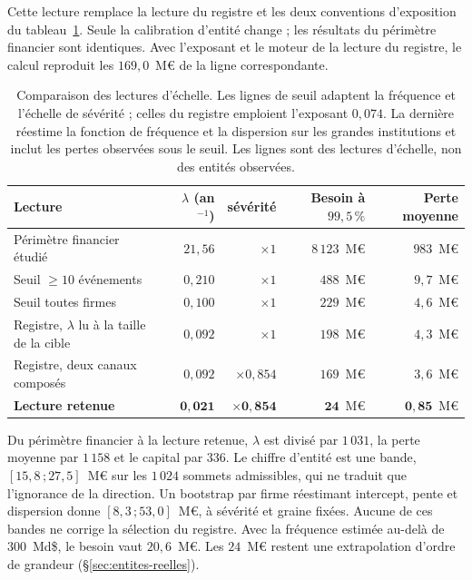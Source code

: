 Cette lecture remplace la lecture du registre et les deux conventions d'exposition du
tableau~\ref{tab:echelle}. Seule la calibration d'entité change ; les résultats du périmètre financier
sont identiques. Avec l'exposant et le moteur de la lecture du registre, le calcul reproduit les
$169{,}0$~M\euro{} de la ligne correspondante.

\begin{table}[htbp]\centering
\small
\begin{tabular}{lrrrr}
\toprule
Lecture & $\lambda$ (an$^{-1}$) & sévérité & Besoin à $99{,}5\,\%$ & Perte moyenne \\
\midrule
Périmètre financier étudié & $21{,}56$ & $\times 1$ & $8\,123$~M\euro & $983$~M\euro \\
Seuil \og{}$\geq 10$ événements\fg{} & $0{,}210$ & $\times 1$ & $488$~M\euro & $9{,}7$~M\euro \\
Seuil \og{}toutes firmes\fg{} & $0{,}100$ & $\times 1$ & $229$~M\euro & $4{,}6$~M\euro \\
Registre, $\lambda$ lu à la taille de la cible & $0{,}092$ & $\times 1$ & $198$~M\euro & $4{,}3$~M\euro \\
Registre, deux canaux composés & $0{,}092$ & $\times 0{,}854$ & $169$~M\euro & $3{,}6$~M\euro \\
\textbf{Lecture retenue} & $\mathbf{0{,}021}$ & $\mathbf{\times 0{,}854}$ &
$\mathbf{24}$~M\euro & $\mathbf{0{,}85}$~M\euro \\
\bottomrule
\end{tabular}
\caption{Comparaison des lectures d'échelle. Les lignes de seuil adaptent la fréquence et l'échelle
de sévérité ; celles du registre emploient l'exposant $0{,}074$. La dernière réestime la fonction de
fréquence et la dispersion sur les grandes institutions et inclut les pertes observées sous le seuil.
Les lignes sont des lectures d'échelle, non des entités observées.}
\label{tab:echelle}
\end{table}

Du périmètre financier à la lecture retenue, $\lambda$ est divisé par $1\,031$, la perte moyenne par $1\,158$ et le capital par $336$. Le chiffre
d'entité est une bande, $[15{,}8\,;27{,}5]$~M\euro{} sur les $1\,024$ sommets admissibles, qui ne traduit
que l'ignorance de la direction. Un bootstrap par firme réestimant intercept, pente et dispersion
donne $[8{,}3\,;53{,}0]$~M\euro{}, à sévérité et graine fixées. Aucune de ces bandes ne corrige
la sélection du registre. Avec la fréquence estimée au-delà de $300$~Md\$, le besoin vaut $20{,}6$~M\euro. Les
$24$~M\euro{} restent une extrapolation d'ordre de grandeur (\S\ref{sec:entites-reelles}).

